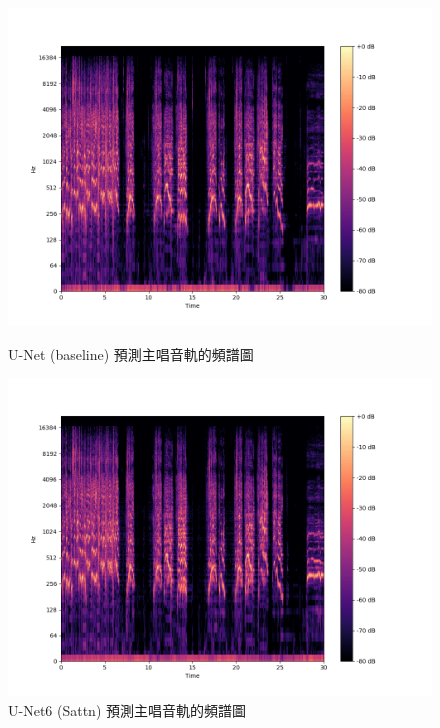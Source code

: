 \begin{figure}[htbp]
    \hfil
    \begin{minipage}[t]{0.4\textwidth}
        \includegraphics[width=\textwidth]{./figures/chapter05_result/6-Unet(base)_vocals.png}
        \caption {U-Net (baseline) 預測主唱音軌的頻譜圖}
        \label{U-Net6(baseline)_vocals}
    \end{minipage}
    \begin{minipage}[t]{0.4\textwidth}
        \includegraphics[width=\textwidth]{./figures/chapter05_result/6-Unet(Sattn_C-V4)_vocals.png}
        \caption {U-Net6 (Sattn) 預測主唱音軌的頻譜圖}
        \label{U-Net6(Sattn)_vocals}
    \end{minipage}
    \hfil
\end{figure}

